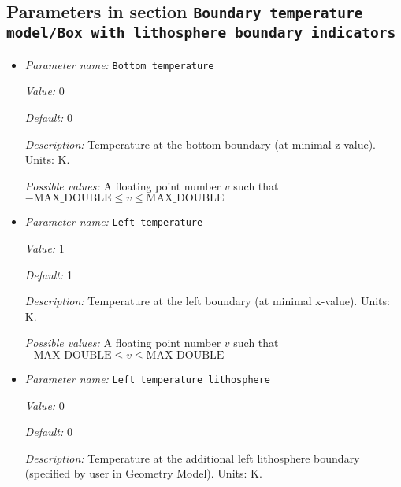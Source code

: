 \subsection{Parameters in section \tt Boundary temperature model/Box with lithosphere boundary indicators}
\label{parameters:Boundary_20temperature_20model/Box_20with_20lithosphere_20boundary_20indicators}

\begin{itemize}
\item {\it Parameter name:} {\tt Bottom temperature}
\label{parameters:Boundary temperature model/Box with lithosphere boundary indicators/Bottom temperature}


{\it Value:} 0


{\it Default:} 0


{\it Description:} Temperature at the bottom boundary (at minimal z-value). Units: K.


{\it Possible values:} A floating point number $v$ such that $-\text{MAX\_DOUBLE} \leq v \leq \text{MAX\_DOUBLE}$
\item {\it Parameter name:} {\tt Left temperature}
\label{parameters:Boundary temperature model/Box with lithosphere boundary indicators/Left temperature}


{\it Value:} 1


{\it Default:} 1


{\it Description:} Temperature at the left boundary (at minimal x-value). Units: K.


{\it Possible values:} A floating point number $v$ such that $-\text{MAX\_DOUBLE} \leq v \leq \text{MAX\_DOUBLE}$
\item {\it Parameter name:} {\tt Left temperature lithosphere}
\label{parameters:Boundary temperature model/Box with lithosphere boundary indicators/Left temperature lithosphere}


{\it Value:} 0


{\it Default:} 0


{\it Description:} Temperature at the additional left lithosphere boundary (specified by user in Geometry Model). Units: K.



\end{itemize}
